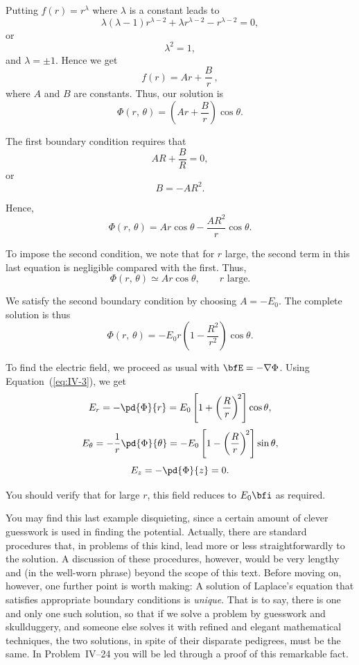 Putting $f(r) = r^\lambda$ where $\lambda$ is a constant leads to
\[
\lambda(\lambda - 1)r^{\lambda-2} + \lambda r^{\lambda-2} - r^{\lambda-2} = 0,
\]
or
\[
\lambda^2 = 1,
\]
and $\lambda = \pm 1$.  Hence we get
\[
f(r) = Ar + \frac{B}{r}\,,
\]
where $A$ and $B$ are constants.  Thus, our solution is
\[
\Phi(r,\,\theta) = \left(Ar + \frac{B}{r}\right)\cos\theta.
\]

The first boundary condition requires that
\[
AR + \frac{B}{R} = 0,
\]
or
\[
B = -AR^2.
\]

Hence,
\[
\Phi(r,\,\theta) = Ar\cos\theta - \frac{AR^2}{r}\cos\theta.
\]

To impose the second condition, we note that for $r$ large, the
second term in this last equation is negligible compared with the
first.  Thus,
\[
\Phi(r,\,\theta) \simeq Ar\cos\theta,\qquad r\text{ large.}
\]

We satisfy the second boundary condition by choosing $A = -E_0$.
The complete solution is thus
\[
\Phi(r,\,\theta) = -E_0 r\left(1 - \frac{R^2}{r^2}\right)\cos\theta.
\]

To find the electric field, we proceed as usual with
$\bfE = -\nabla\Phi$.  Using Equation~(\ref{eq:IV-3}), we get
\[
E_r = -\pd{\Phi}{r}
    = E_0\left[1 + \left(\frac{R}{r}\right)^{\!2}\right]\cos\theta,
\]
\[
E_\theta = -\frac{1}{r}\pd{\Phi}{\theta}
         = -E_0\left[1 - \left(\frac{R}{r}\right)^{\!2}\right]\sin\theta,
\]
\[
E_z = -\pd{\Phi}{z} = 0.
\]

You should verify that for large $r$, this field reduces to
$E_0\bfi$ as required.

You may find this last example disquieting, since a certain amount
of clever guesswork is used in finding the potential.  Actually,
there are standard procedures that, in problems of this kind, lead
more or less straightforwardly to the solution.  A discussion of
these procedures, however, would be very lengthy and (in the
well-worn phrase) beyond the scope of this text.  Before moving on,
however, one further point is worth making: A solution of Laplace's
equation that satisfies appropriate boundary conditions is
\emph{unique}.  That is to say, there is one and only one such
solution, so that if we solve a problem by guesswork and
skullduggery, and someone else solves it with refined and elegant
mathematical techniques, the two solutions, in spite of their
disparate pedigrees, must be the same.  In Problem~IV--24 you will
be led through a proof of this remarkable fact.


